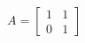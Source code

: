 \documentclass[preview]{standalone}
\begin{document}
\begin{center}
$\displaystyle A=\left[\begin{matrix}1 & 1\\0 & 1\end{matrix}\right]$
\end{center}
\end{document}
